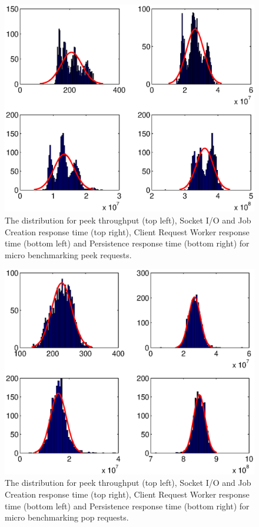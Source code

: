 \documentclass{article}
\begin{document}
        
        \begin{figure}[hbtp]
        \centering
        \includegraphics[scale=1]{img/histfit_peek_io_crw_db}
        \caption{The distribution for peek throughput (top left), Socket I/O and Job Creation response time (top right), Client Request Worker response time (bottom left) and Persistence response time (bottom right) for micro benchmarking peek requests.}
        \end{figure}
        
        \begin{figure}[hbtp]
        \centering
        \includegraphics[scale=1]{img/histfit_pop_io_crw_db}
        \caption{The distribution for peek throughput (top left), Socket I/O and Job Creation response time (top right), Client Request Worker response time (bottom left) and Persistence response time (bottom right) for micro benchmarking pop requests.}
        \end{figure}
        
\end{document}
